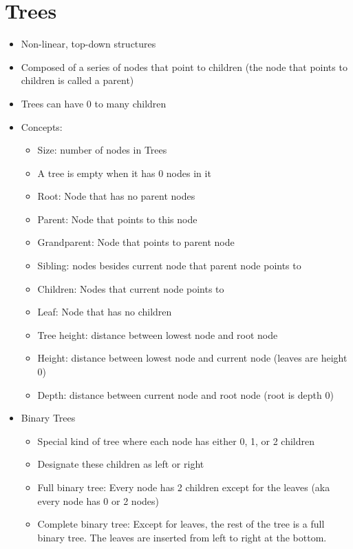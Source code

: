 \documentclass{article}
\begin{document}
\section{Trees}
\begin{itemize}
    \item Non-linear, top-down structures
    \item Composed of a series of nodes that point to children (the node that points to children is called a parent)
    \item Trees can have 0 to many children
    \item Concepts:
        \begin{itemize}
            \item Size: number of nodes in Trees
            \item A tree is empty when it has 0 nodes in it
            \item Root: Node that has no parent nodes
            \item Parent: Node that points to this node
            \item Grandparent: Node that points to parent node
            \item Sibling: nodes besides current node that parent node points to
            \item Children: Nodes that current node points to
            \item Leaf: Node that has no children
            \item Tree height: distance between lowest node and root node
            \item Height: distance between lowest node and current node (leaves are height 0)
            \item Depth: distance between current node and root node (root is depth 0)
        \end{itemize}
    \item Binary Trees
        \begin{itemize}
            \item Special kind of tree where each node has either 0, 1, or 2 children
            \item Designate these children as left or right
            \item Full binary tree: Every node has 2 children except for the leaves (aka every node has 0 or 2 nodes)
            \item Complete binary tree: Except for leaves, the rest of the tree is a full binary tree. The leaves are inserted from left to right at the bottom.

\end{itemize}
\end{itemize}
\end{document}

